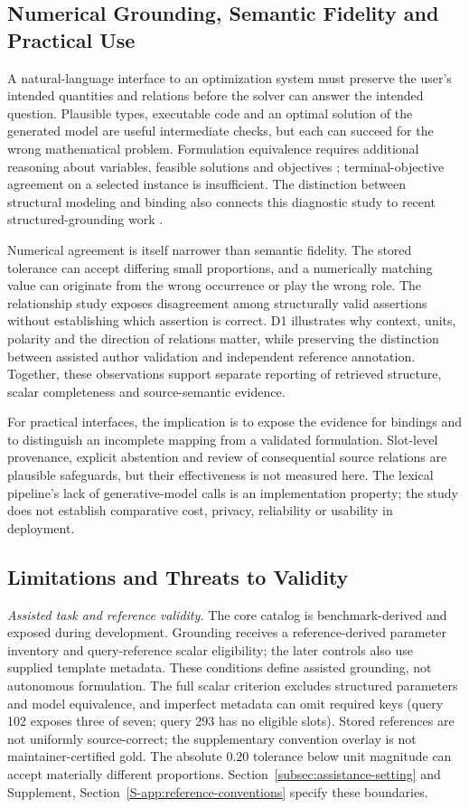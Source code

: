 \documentclass[pdflatex,sn-basic,Numbered]{sn-jnl}
\begin{document}
\subsection{Numerical Grounding, Semantic Fidelity and Practical Use}
A natural-language interface to an optimization system must preserve the user's intended quantities and relations before the solver can answer the intended question. Plausible types, executable code and an optimal solution of the generated model are useful intermediate checks, but each can succeed for the wrong mathematical problem. Formulation equivalence requires additional reasoning about variables, feasible solutions and objectives \cite{zhai2025equivamap}; terminal-objective agreement on a selected instance is insufficient. The distinction between structural modeling and binding also connects this diagnostic study to recent structured-grounding work \cite{gao2026models}.

Numerical agreement is itself narrower than semantic fidelity. The stored tolerance can accept differing small proportions, and a numerically matching value can originate from the wrong occurrence or play the wrong role. The relationship study exposes disagreement among structurally valid assertions without establishing which assertion is correct. D1 illustrates why context, units, polarity and the direction of relations matter, while preserving the distinction between assisted author validation and independent reference annotation. Together, these observations support separate reporting of retrieved structure, scalar completeness and source-semantic evidence.

For practical interfaces, the implication is to expose the evidence for bindings and to distinguish an incomplete mapping from a validated formulation. Slot-level provenance, explicit abstention and review of consequential source relations are plausible safeguards, but their effectiveness is not measured here. The lexical pipeline's lack of generative-model calls is an implementation property; the study does not establish comparative cost, privacy, reliability or usability in deployment.

\subsection{Limitations and Threats to Validity}
\label{subsec:limitations}
\emph{Assisted task and reference validity.} The core catalog is benchmark-derived and exposed during development. Grounding receives a reference-derived parameter inventory and query-reference scalar eligibility; the later controls also use supplied template metadata. These conditions define assisted grounding, not autonomous formulation. The full scalar criterion excludes structured parameters and model equivalence, and imperfect metadata can omit required keys (query 102 exposes three of seven; query 293 has no eligible slots). Stored references are not uniformly source-correct; the supplementary convention overlay is not maintainer-certified gold. The absolute $0.20$ tolerance below unit magnitude can accept materially different proportions. Section~\ref{subsec:assistance-setting} and Supplement, Section~\ref{S-app:reference-conventions} specify these boundaries.
\end{document}
